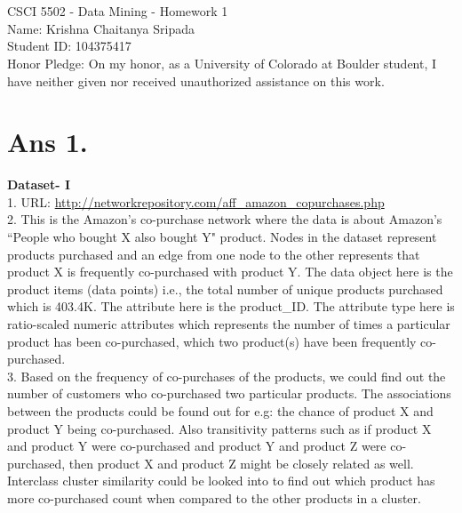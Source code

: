 \documentclass[10pt]{article}
\begin{document}
\section*{}
\begin{flushleft}
CSCI 5502 - Data Mining - Homework 1\\
Name: Krishna Chaitanya Sripada\\
Student ID: 104375417\\
Honor Pledge: On my honor, as a University of Colorado at Boulder student, I have neither given nor received unauthorized assistance on this work.
\end{flushleft}
\section*{Ans 1.}
\begin{flushleft}
\textbf{Dataset- I}\\
\vspace{1em}
1. URL: \url{http://networkrepository.com/aff_amazon_copurchases.php}\\
\vspace{1em}
2. This is the Amazon's co-purchase network where the data is about Amazon's ``People who bought X also bought Y" product. Nodes in the dataset represent products purchased and an edge from one node to the other represents that product X is frequently co-purchased with product Y. The data object here is the product items (data points) i.e., the total number of unique products purchased which is 403.4K. The attribute here is the product\_ID. The attribute type here is ratio-scaled numeric attributes which represents the number of times a particular product has been co-purchased, which two product(s) have been frequently co-purchased. \\
\vspace{1em}
3. Based on the frequency of co-purchases of the products, we could find out the number of customers who co-purchased two particular products. The associations between the products could be found out for e.g: the chance of product X and product Y being co-purchased. Also transitivity patterns such as if product X and product Y were co-purchased and product Y and product Z were co-purchased, then product X and product Z might be closely related as well. Interclass cluster similarity could be looked into to find out which product has more co-purchased count when compared to the other products in a cluster.\\
\vspace{1em}

\end{flushleft}
\end{document}
